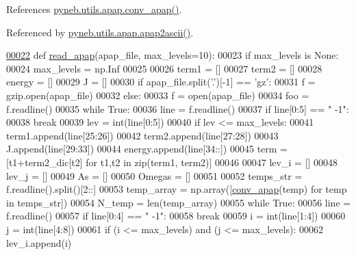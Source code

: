 References \hyperlink{apap_8py_source_l00012}{pyneb.\+utils.\+apap.\+conv\+\_\+apap()}.



Referenced by \hyperlink{apap_8py_source_l00078}{pyneb.\+utils.\+apap.\+apap2ascii()}.


\begin{DoxyCode}
\hypertarget{namespacepyneb_1_1utils_1_1apap_l00022}{}\hyperlink{namespacepyneb_1_1utils_1_1apap_ad24a246526c0913b752319c5a2846412}{00022} \textcolor{keyword}{def }\hyperlink{namespacepyneb_1_1utils_1_1apap_ad24a246526c0913b752319c5a2846412}{read\_apap}(apap\_file, max\_levels=10):
00023     \textcolor{keywordflow}{if} max\_levels \textcolor{keywordflow}{is} \textcolor{keywordtype}{None}:
00024         max\_levels = np.Inf
00025         
00026     term1 = []
00027     term2 = []
00028     energy = []
00029     J = []
00030     \textcolor{keywordflow}{if} apap\_file.split(\textcolor{stringliteral}{'.'})[-1] == \textcolor{stringliteral}{'gz'}:
00031         f = gzip.open(apap\_file)
00032     \textcolor{keywordflow}{else}:
00033         f = open(apap\_file)
00034     foo = f.readline()
00035     \textcolor{keywordflow}{while} \textcolor{keyword}{True}:
00036         line = f.readline()
00037         \textcolor{keywordflow}{if} line[0:5] == \textcolor{stringliteral}{"   -1"}:
00038             \textcolor{keywordflow}{break}
00039         lev = int(line[0:5])
00040         \textcolor{keywordflow}{if} lev <= max\_levels:
00041             term1.append(line[25:26])
00042             term2.append(line[27:28])
00043             J.append(line[29:33])
00044             energy.append(line[34::])
00045     term = [t1+term2\_dic[t2] \textcolor{keywordflow}{for} t1,t2 \textcolor{keywordflow}{in} zip(term1, term2)]
00046     
00047     lev\_i = []
00048     lev\_j = []
00049     As = []
00050     Omegas = []
00051     
00052     temps\_str = f.readline().split()[2::]
00053     temp\_array = np.array([\hyperlink{namespacepyneb_1_1utils_1_1apap_ad78f65e1ca140daa8a34fd88a91db97a}{conv\_apap}(temp) \textcolor{keywordflow}{for} temp \textcolor{keywordflow}{in} temps\_str])
00054     N\_temp = len(temp\_array)
00055     \textcolor{keywordflow}{while} \textcolor{keyword}{True}:
00056         line = f.readline()
00057         \textcolor{keywordflow}{if} line[0:4] == \textcolor{stringliteral}{"  -1"}:
00058             \textcolor{keywordflow}{break}
00059         i = int(line[1:4])
00060         j = int(line[4:8])
00061         \textcolor{keywordflow}{if} (i <= max\_levels) \textcolor{keywordflow}{and} (j <= max\_levels):
00062             lev\_i.append(i)

\end{DoxyCode}
